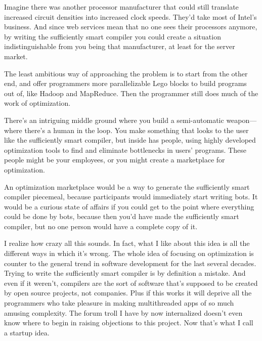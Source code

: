 Imagine there was
                  another processor manufacturer that could still translate
                  increased circuit densities into increased clock speeds.
                  They'd take most of Intel's business. And since web services
                  mean that no one sees their processors anymore, by writing the
                  sufficiently smart compiler you could create a situation
                  indistinguishable from you being that manufacturer, at least
                  for the server market.

The least ambitious way of
                  approaching the problem is to start from the other end, and
                  offer programmers more parallelizable Lego blocks to build
                  programs out of, like Hadoop and MapReduce. Then the
                  programmer still does much of the work of optimization.

There's
                  an intriguing middle ground where you build a semi-automatic
                  weapon---where there's a human in the loop. You make
                  something that looks to the user like the sufficiently smart
                  compiler, but inside has people, using highly developed
                  optimization tools to find and eliminate bottlenecks in users'
                  programs. These people might be your employees, or you might
                  create a marketplace for optimization.

An
                  optimization marketplace would be a way to generate the
                  sufficiently smart compiler piecemeal, because participants
                  would immediately start writing bots. It would be a curious
                  state of affairs if you could get to the point where
                  everything could be done by bots, because then you'd have made
                  the sufficiently smart compiler, but no one person would have
                  a complete copy of it.

I realize how crazy all this
                  sounds. In fact, what I like about this idea is all the
                  different ways in which it's wrong. The whole idea of focusing
                  on optimization is counter to the general trend in software
                  development for the last several decades. Trying to write the
                  sufficiently smart compiler is by definition a mistake. And
                  even if it weren't, compilers are the sort of software that's
                  supposed to be created by open source projects, not companies.
                  Plus if this works it will deprive all the programmers who
                  take pleasure in making multithreaded apps of so much amusing
                  complexity. The forum troll I have by now internalized doesn't
                  even know where to begin in raising objections to this
                  project. Now that's what I call a startup idea.

